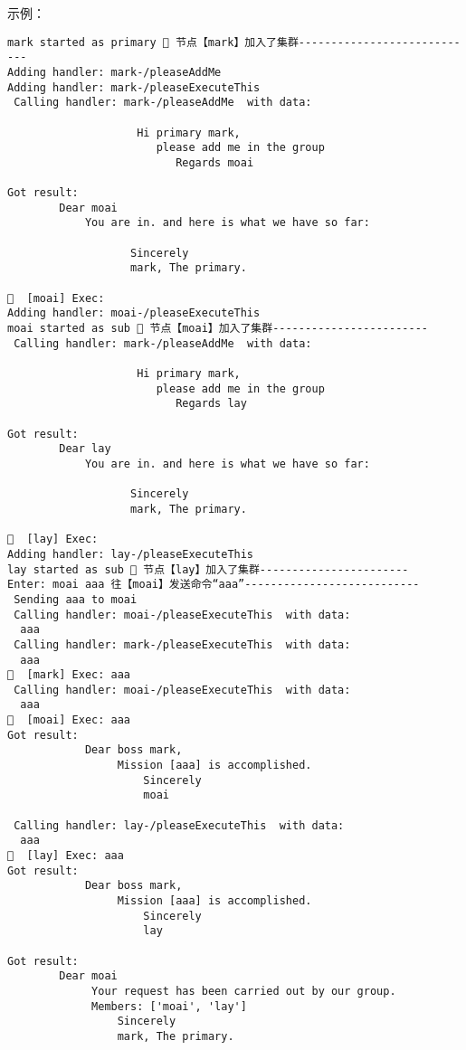 示例：
\begin{verbatim}
mark started as primary 🐸 节点【mark】加入了集群----------------------------
Adding handler: mark-/pleaseAddMe
Adding handler: mark-/pleaseExecuteThis
 Calling handler: mark-/pleaseAddMe  with data:
  
                    Hi primary mark,
                       please add me in the group
                          Regards moai
                     
Got result: 
        Dear moai
            You are in. and here is what we have so far:
            
                   Sincerely
                   mark, The primary.
         
🦜  [moai] Exec:              
Adding handler: moai-/pleaseExecuteThis
moai started as sub 🐸 节点【moai】加入了集群------------------------
 Calling handler: mark-/pleaseAddMe  with data:
  
                    Hi primary mark,
                       please add me in the group
                          Regards lay
                     
Got result: 
        Dear lay
            You are in. and here is what we have so far:
            
                   Sincerely
                   mark, The primary.
         
🦜  [lay] Exec:              
Adding handler: lay-/pleaseExecuteThis
lay started as sub 🐸 节点【lay】加入了集群-----------------------
Enter: moai aaa 往【moai】发送命令“aaa”---------------------------
 Sending aaa to moai 
 Calling handler: moai-/pleaseExecuteThis  with data:
  aaa 
 Calling handler: mark-/pleaseExecuteThis  with data:
  aaa 
🦜  [mark] Exec: aaa 
 Calling handler: moai-/pleaseExecuteThis  with data:
  aaa 
🦜  [moai] Exec: aaa 
Got result: 
            Dear boss mark,
                 Mission [aaa] is accomplished.
                     Sincerely
                     moai
             
 Calling handler: lay-/pleaseExecuteThis  with data:
  aaa 
🦜  [lay] Exec: aaa 
Got result: 
            Dear boss mark,
                 Mission [aaa] is accomplished.
                     Sincerely
                     lay
             
Got result: 
        Dear moai
             Your request has been carried out by our group.
             Members: ['moai', 'lay']
                 Sincerely
                 mark, The primary.
         

\end{verbatim}
